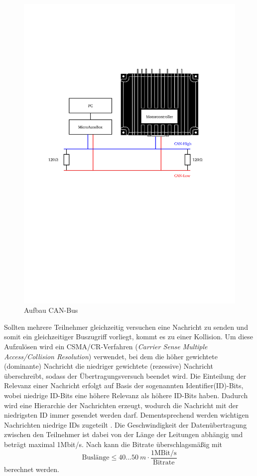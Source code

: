\begin{figure}[h]
	\centering
		\includegraphics{Bilder/CAN2.pdf}
	\caption{Aufbau CAN-Bus \cite[S.158]{manual}}
	\label{fig:CAN}
\end{figure} \noindent

Sollten mehrere Teilnehmer gleichzeitig versuchen eine Nachricht zu senden und somit ein gleichzeitiger Buszugriff vorliegt, kommt es zu einer Kollision. Um diese Aufzulösen wird ein CSMA/CR-Verfahren (\textit{Carrier Sense Multiple Access/Collision Resolution}) verwendet, bei dem die höher gewichtete (dominante) Nachricht die niedriger gewichtete (rezessive) Nachricht überschreibt, sodass der Übertragungsversuch beendet wird. Die Einteilung der Relevanz einer Nachricht erfolgt auf Basis der sogenannten Identifier(ID)-Bits, wobei niedrige ID-Bits eine höhere Relevanz als höhere ID-Bits haben. Dadurch wird eine Hierarchie der Nachrichten erzeugt, wodurch die Nachricht mit der niedrigsten ID immer gesendet werden darf. Dementsprechend werden wichtigen Nachrichten niedrige IDs zugeteilt \cite{Lawrenz2010}. 
Die Geschwindigkeit der Datenübertragung zwischen den Teilnehmer ist dabei von der Länge der Leitungen abhängig und beträgt maximal 1Mbit/s. Nach \cite[S.58]{Werner2014} kann die Bitrate überschlagsmäßig mit 
\begin{equation}
	\text{Buslänge}\leq 40...\SI{50}{m}\cdot \frac{1\text{MBit/s}}{\text{Bitrate}}
	\label{eq:CAN}
\end{equation}
berechnet werden.

